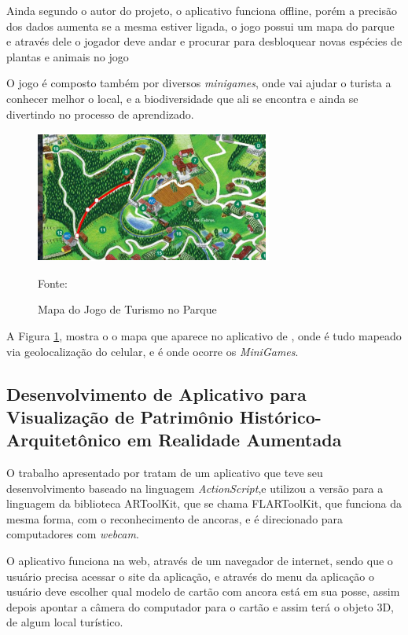 		Ainda segundo o autor do projeto, o  aplicativo funciona offline, porém a precisão dos dados aumenta se a mesma estiver ligada, o jogo possui um mapa do parque e através dele o jogador deve andar e procurar para desbloquear novas espécies de plantas e animais no jogo
		
		O jogo é composto também por diversos \textit{minigames}, onde vai ajudar o turista a conhecer melhor o local, e a biodiversidade que ali se encontra e ainda se divertindo no processo de aprendizado.
		
		\begin{figure}[H]
			\centering
			\includegraphics[scale=1]{imagens/parque}
			\caption{Mapa do Jogo de Turismo no Parque}
			Fonte: 
			\label{fig:parque}
		\end{figure}
		
		A Figura \ref{fig:parque}, mostra o o mapa que aparece no aplicativo de , onde é tudo mapeado via geolocalização do celular, e é onde ocorre os \textit{MiniGames}.
	
	\subsection{Desenvolvimento de Aplicativo para Visualização de Patrimônio Histórico-Arquitetônico em Realidade Aumentada}
		O trabalho apresentado por  tratam de um aplicativo que teve seu desenvolvimento baseado na linguagem \textit{ActionScript},e utilizou a versão para a linguagem da biblioteca ARToolKit, que se chama FLARToolKit, que funciona da mesma forma, com o reconhecimento de ancoras, e é direcionado para computadores com \textit{webcam}.
		
		O aplicativo funciona na web, através de um navegador de internet, sendo que o usuário precisa acessar o site da aplicação, e através do menu da aplicação o usuário deve escolher qual modelo de cartão com ancora está em sua posse, assim depois apontar a câmera do computador para o cartão e assim terá o objeto 3D, de algum local turístico.
		
